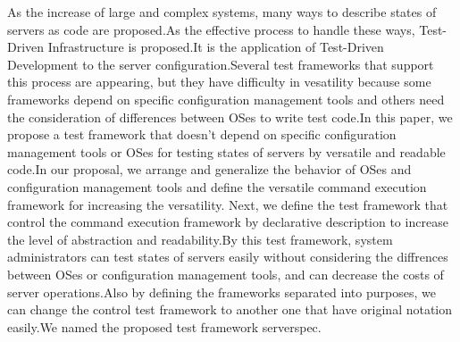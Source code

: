 \begin{eabstract}
As the increase of large and complex systems, many ways to describe states of servers as code are proposed.As the effective process to handle these ways, Test-Driven Infrastructure is proposed.It is the application of Test-Driven Development to the server configuration.Several test frameworks that support this process are appearing, but they have difficulty in vesatility because some frameworks depend on specific configuration management tools and others need the consideration of differences between OSes to write test code.In this paper, we propose a test framework that doesn't depend on specific configuration management tools or OSes for testing states of servers by versatile and readable code.In our proposal, we arrange and generalize the behavior of OSes and configuration management tools and define the versatile command execution framework for increasing the versatility. Next, we define the test framework that control the command execution framework by declarative description to increase the level of abstraction and readability.By this test framework, system administrators can test states of servers easily without considering the diffrences between OSes or configuration management tools, and can decrease the costs of server operations.Also by defining the frameworks separated into purposes, we can change the control test framework to another one that have original notation easily.We named the proposed test framework serverspec.
\end{eabstract}
